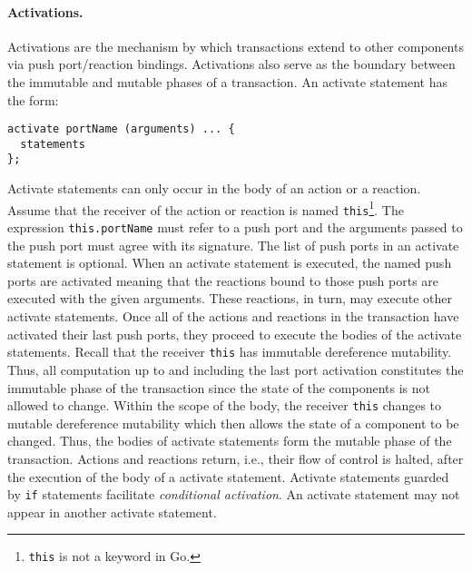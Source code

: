 \paragraph{Activations.}
Activations are the mechanism by which transactions extend to other components via push port/reaction bindings.
Activations also serve as the boundary between the immutable and mutable phases of a transaction.
An activate statement has the form:
\begin{verbatim}
activate portName (arguments) ... {
  statements
};
\end{verbatim}
Activate statements can only occur in the body of an action or a reaction.
Assume that the receiver of the action or reaction is named \verb+this+\footnote{\verb+this+ is not a keyword in Go.}.
The expression \verb+this.portName+ must refer to a push port and the arguments passed to the push port must agree with its signature.
The list of push ports in an activate statement is optional.
When an activate statement is executed, the named push ports are activated meaning that the reactions bound to those push ports are executed with the given arguments.
These reactions, in turn, may execute other activate statements.
Once all of the actions and reactions in the transaction have activated their last push ports, they proceed to execute the bodies of the activate statements.
Recall that the receiver \verb+this+ has immutable dereference mutability.
Thus, all computation up to and including the last port activation constitutes the immutable phase of the transaction since the state of the components is not allowed to change.
Within the scope of the body, the receiver \verb+this+ changes to mutable dereference mutability which then allows the state of a component to be changed.
Thus, the bodies of activate statements form the mutable phase of the transaction.
Actions and reactions return, i.e., their flow of control is halted, after the execution of the body of a activate statement.
Activate statements guarded by \verb+if+ statements facilitate \emph{conditional activation}.
An activate statement may not appear in another activate statement.

